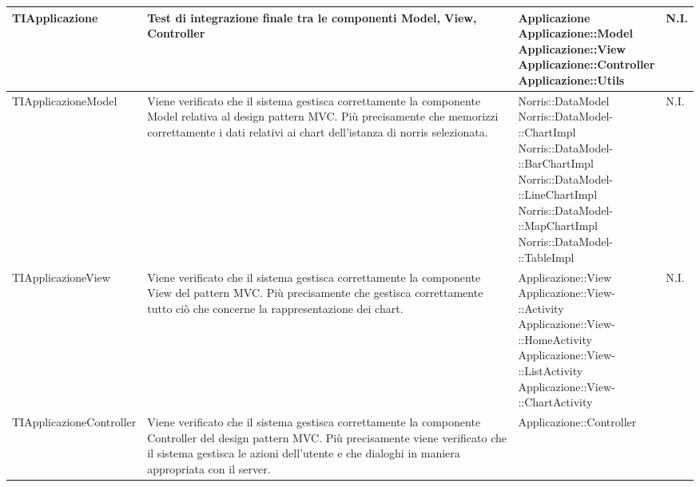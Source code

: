 \begin{longtabu}{| X | X | X[0.9] | X[0.3] |}
			TIApplicazione &
			Test di integrazione finale tra le componenti Model, View, Controller
			& \parbox[t]{0.6\textwidth}{
			Applicazione\\
			Applicazione::Model\\
			Applicazione::View\\
			Applicazione::Controller\\
			Applicazione::Utils}
			& N.I.
\\ \hline
			TIApplicazioneModel &
			Viene verificato che il sistema gestisca correttamente la componente Model relativa al design pattern MVC. Più precisamente che memorizzi correttamente i dati relativi ai chart dell'istanza di norris selezionata.
			& \parbox[t]{0.6\textwidth}{
			Norris::DataModel\\
			Norris::DataModel-\\::ChartImpl\\
			Norris::DataModel-\\::BarChartImpl\\
			Norris::DataModel-\\::LineChartImpl\\
			Norris::DataModel-\\::MapChartImpl\\
			Norris::DataModel-\\::TableImpl}
			& N.I.
\\ \hline
			TIApplicazioneView &
			Viene verificato che il sistema gestisca correttamente la componente View del pattern MVC. Più precisamente che gestisca correttamente tutto ciò che concerne la rappresentazione dei chart.
			& \parbox[t]{0.6\textwidth}{
			Applicazione::View\\
			Applicazione::View-\\::Activity\\
			Applicazione::View-\\::HomeActivity\\
			Applicazione::View-\\::ListActivity\\
			Applicazione::View-\\::ChartActivity}
			& N.I.
\\ \hline
			TIApplicazioneController &
			Viene verificato che il sistema gestisca correttamente la componente Controller del design pattern MVC. Più precisamente viene verificato che il sistema gestisca le azioni dell’utente e che dialoghi in maniera appropriata con il server.
			& \parbox[t]{0.6\textwidth}{
			Applicazione::Controller\\
}
\end{longtabu}
